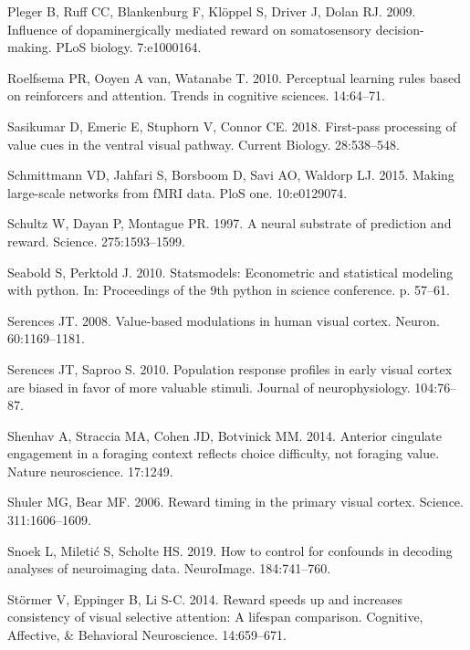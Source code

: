 \documentclass[]{article}
\begin{document}
\leavevmode\hypertarget{ref-Plegeretal2009}{}%
Pleger B, Ruff CC, Blankenburg F, Klöppel S, Driver J, Dolan RJ. 2009.
Influence of dopaminergically mediated reward on somatosensory
decision-making. PLoS biology. 7:e1000164.

\leavevmode\hypertarget{ref-Roelfsemaetal2010}{}%
Roelfsema PR, Ooyen A van, Watanabe T. 2010. Perceptual learning rules
based on reinforcers and attention. Trends in cognitive sciences.
14:64--71.

\leavevmode\hypertarget{ref-Sasikumaretal2018}{}%
Sasikumar D, Emeric E, Stuphorn V, Connor CE. 2018. First-pass
processing of value cues in the ventral visual pathway. Current Biology.
28:538--548.

\leavevmode\hypertarget{ref-Schmittmannetal2015}{}%
Schmittmann VD, Jahfari S, Borsboom D, Savi AO, Waldorp LJ. 2015. Making
large-scale networks from fMRI data. PloS one. 10:e0129074.

\leavevmode\hypertarget{ref-Schultzetal1997}{}%
Schultz W, Dayan P, Montague PR. 1997. A neural substrate of prediction
and reward. Science. 275:1593--1599.

\leavevmode\hypertarget{ref-SeaboldPerktold2010}{}%
Seabold S, Perktold J. 2010. Statsmodels: Econometric and statistical
modeling with python. In: Proceedings of the 9th python in science
conference. p. 57--61.

\leavevmode\hypertarget{ref-Serences2008}{}%
Serences JT. 2008. Value-based modulations in human visual cortex.
Neuron. 60:1169--1181.

\leavevmode\hypertarget{ref-SerencesSapro2010}{}%
Serences JT, Saproo S. 2010. Population response profiles in early
visual cortex are biased in favor of more valuable stimuli. Journal of
neurophysiology. 104:76--87.

\leavevmode\hypertarget{ref-Shenhavetal2014}{}%
Shenhav A, Straccia MA, Cohen JD, Botvinick MM. 2014. Anterior cingulate
engagement in a foraging context reflects choice difficulty, not
foraging value. Nature neuroscience. 17:1249.

\leavevmode\hypertarget{ref-Shuleretal2006}{}%
Shuler MG, Bear MF. 2006. Reward timing in the primary visual cortex.
Science. 311:1606--1609.

\leavevmode\hypertarget{ref-Snoeketal2019}{}%
Snoek L, Miletić S, Scholte HS. 2019. How to control for confounds in
decoding analyses of neuroimaging data. NeuroImage. 184:741--760.

\leavevmode\hypertarget{ref-Stormer2014}{}%
Störmer V, Eppinger B, Li S-C. 2014. Reward speeds up and increases
consistency of visual selective attention: A lifespan comparison.
Cognitive, Affective, \& Behavioral Neuroscience. 14:659--671.
\end{document}
